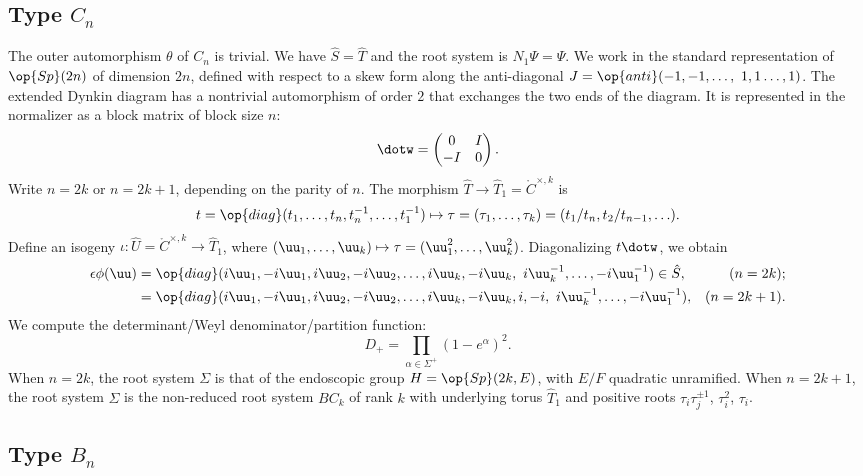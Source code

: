 \subsection{Type $C_n$}

The outer automorphism $\theta$ of $C_n$ is trivial.  We have $\hat S
= \hat T$ and the root system is $N_1\Psi =\Psi$.  We work in the
standard representation of $\op{Sp}(2n)$ of dimension $2n$, defined
with respect to a skew form along the anti-diagonal $J =
\op{anti}(-1,-1,\ldots,\ 1,1\ldots,1)$.  The extended Dynkin diagram
has a nontrivial automorphism of order $2$ that exchanges the two ends
of the diagram.  It is represented in the normalizer as a block matrix
of block size $n$:
\[
\dotw = \begin{pmatrix} 0 &I \\ -I & 0\end{pmatrix}.
\]
Write $n = 2k$ or $n = 2k+1$, depending on the parity of $n$.  The
morphism $\hat T\to \hat T_1=\ring{C}^{\times,k}$ is
\[
t = \op{diag}(t_1,\ldots,t_n,t_n^{-1},\ldots,t_1^{-1})
\mapsto \tau=(\tau_1,\ldots,\tau_k)=(t_1/t_n,t_2/t_{n-1},\ldots).
\]
Define an isogeny $\iota:\hat U=\ring{C}^{\times,k} \to \hat T_1$,
where $(\uu_1,\ldots,\uu_k)\mapsto \tau=(\uu_1^2,\ldots,\uu_k^2)$.
Diagonalizing $t\dotw$, we obtain
\begin{align*}
\epsilon\phi(\uu) 
&= \op{diag}(i \uu_1,-i\uu_1,i\uu_2,-i\uu_2,\ldots,i\uu_k,
-i\uu_k,\ i\uu_k^{-1},\ldots, -i\uu_1^{-1})\in \hat S,
& (n = 2k);\\
    &= \op{diag}(i \uu_1,-i\uu_1,i\uu_2,-i\uu_2,\ldots,i\uu_k,-i\uu_k,i,
  -i,\ i\uu_k^{-1},\ldots, -i\uu_1^{-1}),
& (n = 2k+1).\\
\end{align*}
We compute the determinant/Weyl denominator/partition function:
\begin{equation}
D_+ = \prod_{\alpha\in \Sigma^+} (1-e^\alpha)^2.
\end{equation}
When $n=2k$, the root system $\Sigma$ is that of the endoscopic group
$H=\op{Sp}(2k,E)$, with $E/F$ quadratic unramified.  When $n=2k+1$,
the root system $\Sigma$ is the non-reduced root system $BC_k$ of rank
$k$ with underlying torus $\hat T_1$ and positive roots $\tau_i
\tau_j^{\pm 1}$, $\tau_i^2$, $\tau_i$.

\subsection{Type $B_n$}

